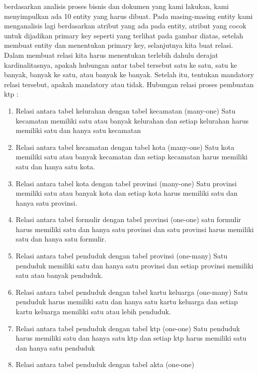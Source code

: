 berdasarkan analisis proses bisnis dan dokumen yang kami lakukan, kami menyimpulkan ada 10 entity yang harus dibuat. Pada masing-masing entity kami menganalisis lagi berdasarkan atribut yang ada pada entity, atribut yang cocok untuk dijadikan primary key seperti yang terlihat pada gambar diatas, setelah membuat entity dan menentukan primary key, selanjutnya kita buat relasi. Dalam membuat relasi kita harus menentukan terlebih dahulu derajat kardinalitasnya, apakah hubungan antar tabel tersebut satu ke satu, satu ke banyak, banyak ke satu, atau banyak ke banyak. Setelah itu, tentukan mandatory relasi tersebut, apakah mandatory atau tidak. Hubungan relasi proses pembuatan ktp :
\begin{enumerate}
\item Relasi antara tabel kelurahan dengan tabel kecamatan (many-one)
Satu kecamatan memiliki satu atau banyak kelurahan dan setiap kelurahan harus memiliki satu dan hanya satu kecamatan\\
\item Relasi antara tabel kecamatan dengan tabel kota (many-one)
Satu kota memiliki satu atau banyak kecamatan dan setiap kecamatan harus memiliki satu dan hanya satu kota.\\
\item Relasi antara tabel kota dengan tabel provinsi (many-one)
Satu provinsi memiliki satu atau banyak kota dan setiap kota harus memiliki satu dan hanya satu provinsi.\\
\item Relasi antara tabel formulir dengan tabel provinsi (one-one)
satu formulir harus memiliki satu dan hanya satu provinsi dan satu provinsi harus memiliki satu dan hanya satu formulir. \\
\item Relasi antara tabel penduduk dengan tabel provinsi (one-many)
Satu penduduk memiliki satu dan hanya satu provinsi dan setiap provinsi memiliki satu atau banyak penduduk. \\
\item Relasi antara tabel penduduk dengan tabel kartu keluarga (one-many)
Satu penduduk harus memiliki satu dan hanya satu kartu keluarga dan setiap kartu keluarga memiliki satu atau lebih penduduk.\\
\item Relasi antara tabel penduduk dengan tabel ktp (one-one)
Satu penduduk harus memiliki satu dan hanya satu ktp dan setiap ktp harus memiliki satu dan hanya satu penduduk\\
\item Relasi antara tabel penduduk dengan tabel akta (one-one)

\end{enumerate}
